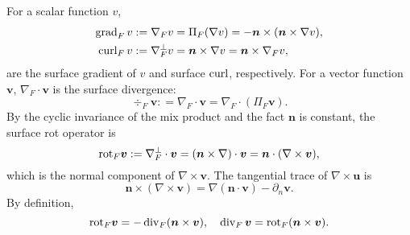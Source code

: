 For a scalar function $v$, 
\begin{align*}
\grad_F v : =\nabla_F v &= \Pi_F (\nabla v) = - \boldsymbol  n \times (\boldsymbol  n\times \nabla v), \\
\curl_F v := \nabla_F^{\bot} v &= \boldsymbol  n \times \nabla v = \boldsymbol  n\times \nabla_F v,
\end{align*}
are the surface gradient of $v$ and surface $\curl$, respectively. For a vector function $\boldsymbol  v$, $\nabla_F\cdot \boldsymbol  v$ is the surface divergence:
$$
\div_F\boldsymbol  v: = \nabla_F\cdot \boldsymbol  v = \nabla_F\cdot (\Pi_F\boldsymbol  v).
$$
By the cyclic invariance of the mix product and the fact $\boldsymbol  n$ is constant, the surface rot operator is
\begin{equation}\label{eq:rotF}
{\rm rot}_F \boldsymbol  v := \nabla_F^{\bot}\cdot \boldsymbol  v = (\boldsymbol  n\times \nabla)\cdot \boldsymbol  v = \boldsymbol  n\cdot (\nabla \times \boldsymbol  v),
\end{equation}
which is the normal component of $\nabla \times \boldsymbol  v$. 
The tangential trace of $\nabla \times \boldsymbol  u$ is 
\begin{equation}\label{eq:tangentialtrace}
\boldsymbol  n\times (\nabla \times \boldsymbol  v) = \nabla (\boldsymbol  n\cdot \boldsymbol  v) - \partial_n \boldsymbol  v. 
\end{equation}
By definition,
\begin{equation}\label{eq:rotFdivF}
{\rm rot}_F \boldsymbol  v = - \div_F (\boldsymbol  n\times \boldsymbol  v), \quad
\div_F \boldsymbol  v = {\rm rot}_F (\boldsymbol  n\times \boldsymbol  v).
\end{equation}







